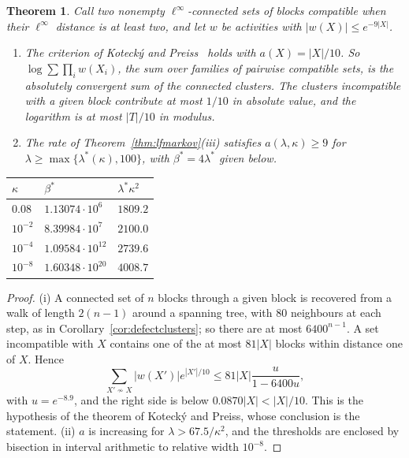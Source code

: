 \documentclass[11pt]{amsart}
\newtheorem{theorem}{Theorem}[section]
\theoremstyle{definition}
\theoremstyle{remark}
\numberwithin{equation}{section}
\begin{document}
\begin{theorem}\label{thm:lfkp}
Call two nonempty $\ell^\infty$-connected sets of blocks compatible when
their $\ell^\infty$ distance is at least two, and let $w$ be activities
with $|w(X)|\le e^{-9|X|}$.
\begin{enumerate}[label=\textup{(\roman*)},leftmargin=*]
\item The criterion of Koteck\'y and Preiss~\cite{KP86} holds with $a(X)=
|X|/10$. So $\log\sum\prod_iw(X_i)$, the sum over families of pairwise
compatible sets, is the absolutely convergent sum of the connected
clusters. The clusters incompatible with a given block contribute at most
$1/10$ in absolute value, and the logarithm is at most $|T|/10$ in modulus.
\item The rate of Theorem~\ref{thm:lfmarkov}(iii) satisfies $a(\lambda,
\kappa)\ge9$ for $\lambda\ge\max\{\lambda^*(\kappa),100\}$, with $\beta^*=
4\lambda^*$ given below.
\end{enumerate}
\begin{center}
\begin{tabular}{lll}
\hline
$\kappa$ & $\beta^*$ & $\lambda^*\kappa^2$\\
\hline
$0.08$ & $1.13074\cdot10^{6}$ & $1809.2$\\
$10^{-2}$ & $8.39984\cdot10^{7}$ & $2100.0$\\
$10^{-4}$ & $1.09584\cdot10^{12}$ & $2739.6$\\
$10^{-8}$ & $1.60348\cdot10^{20}$ & $4008.7$\\
\hline
\end{tabular}
\end{center}
\end{theorem}

\begin{proof}
(i) A connected set of $n$ blocks through a given block is recovered from
a walk of length $2(n-1)$ around a spanning tree, with $80$ neighbours at
each step, as in Corollary~\ref{cor:defectclusters}; so there are at most
$6400^{n-1}$. A set incompatible with $X$ contains one of the at most
$81|X|$ blocks within distance one of $X$. Hence
\[
\sum_{X'\not\sim X}|w(X')|e^{|X'|/10}\le81|X|\frac u{1-6400u},
\]
with $u=e^{-8.9}$, and the right side is below $0.0870|X|<|X|/10$. This is
the hypothesis of the theorem of Koteck\'y and Preiss, whose conclusion is
the statement. (ii) $a$ is increasing for $\lambda>67.5/\kappa^2$, and the
thresholds are enclosed by bisection in interval arithmetic to relative
width $10^{-8}$.
\end{proof}
\end{document}
